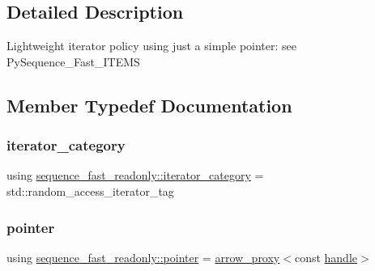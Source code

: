 \subsection{Detailed Description}
Lightweight iterator policy using just a simple pointer\+: see {\ttfamily Py\+Sequence\+\_\+\+Fast\+\_\+\+I\+T\+E\+MS} 

\subsection{Member Typedef Documentation}
\mbox{\label{classsequence__fast__readonly_ae4b169ed0c818d34dfe03e94880c822a}} 
\subsubsection{\texorpdfstring{iterator\_category}{iterator\_category}}
{\footnotesize\ttfamily using \mbox{\hyperlink{classsequence__fast__readonly_ae4b169ed0c818d34dfe03e94880c822a}{sequence\+\_\+fast\+\_\+readonly\+::iterator\+\_\+category}} =  std\+::random\+\_\+access\+\_\+iterator\+\_\+tag\hspace{0.3cm}{\ttfamily [protected]}}

\mbox{\label{classsequence__fast__readonly_acdbb8736f003cfff757d62e6733ebc20}} 
\subsubsection{\texorpdfstring{pointer}{pointer}}
{\footnotesize\ttfamily using \mbox{\hyperlink{classsequence__fast__readonly_acdbb8736f003cfff757d62e6733ebc20}{sequence\+\_\+fast\+\_\+readonly\+::pointer}} =  \mbox{\hyperlink{structarrow__proxy}{arrow\+\_\+proxy}}$<$const \mbox{\hyperlink{classhandle}{handle}}$>$\hspace{0.3cm}{\ttfamily [protected]}}

\mbox{\label{classsequence__fast__readonly_a7b285c12cc5332e8fc7998bcab092fa7}} 
